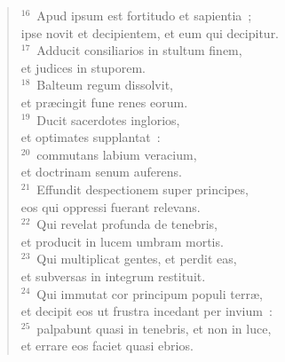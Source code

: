 \begin{flushleft}
\begin{verse}
${}^{16}$~Apud ipsum est fortitudo et sapientia~;\\ ipse novit et decipientem, et eum qui decipitur.\\
${}^{17}$~Adducit consiliarios in stultum finem,\\ et judices in stuporem.\\
${}^{18}$~Balteum regum dissolvit,\\ et pr\ae cingit fune renes eorum.\\
${}^{19}$~Ducit sacerdotes inglorios,\\ et optimates supplantat~:\\
${}^{20}$~commutans labium veracium,\\ et doctrinam senum auferens.\\
${}^{21}$~Effundit despectionem super principes,\\ eos qui oppressi fuerant relevans.\\
${}^{22}$~Qui revelat profunda de tenebris,\\ et producit in lucem umbram mortis.\\
${}^{23}$~Qui multiplicat gentes, et perdit eas,\\ et subversas in integrum restituit.\\
${}^{24}$~Qui immutat cor principum populi terr\ae ,\\ et decipit eos ut frustra incedant per invium~:\\
${}^{25}$~palpabunt quasi in tenebris, et non in luce,\\ et errare eos faciet quasi ebrios.\end{verse}\end{flushleft}


